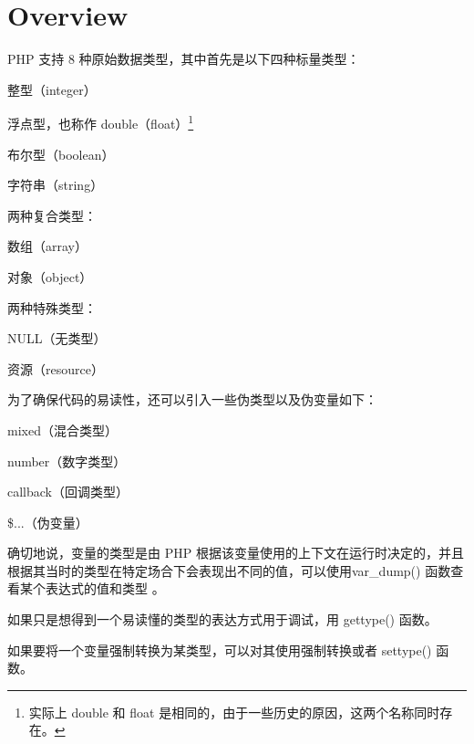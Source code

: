 \section{Overview}



PHP 支持 8 种原始数据类型，其中首先是以下四种标量类型：

\begin{compactitem}
\item 整型（integer）
\item 浮点型，也称作 double（float）\footnote{实际上 double 和 float 是相同的，由于一些历史的原因，这两个名称同时存在。}
\item 布尔型（boolean）
\item 字符串（string）
\end{compactitem}

两种复合类型：

\begin{compactitem}
\item 数组（array）
\item 对象（object）
\end{compactitem}

两种特殊类型：


\begin{compactitem}
\item NULL（无类型）
\item 资源（resource）
\end{compactitem}

为了确保代码的易读性，还可以引入一些伪类型以及伪变量如下：

\begin{compactitem}
\item mixed（混合类型）
\item number（数字类型）
\item callback（回调类型）
\item \$...（伪变量）
\end{compactitem}

确切地说，变量的类型是由 PHP 根据该变量使用的上下文在运行时决定的，并且根据其当时的类型在特定场合下会表现出不同的值，可以使用var\_dump() 函数查看某个表达式的值和类型 。

\begin{compactitem}
\item 如果只是想得到一个易读懂的类型的表达方式用于调试，用 gettype() 函数。
\item 如果要将一个变量强制转换为某类型，可以对其使用强制转换或者 settype() 函数。
\end{compactitem}

